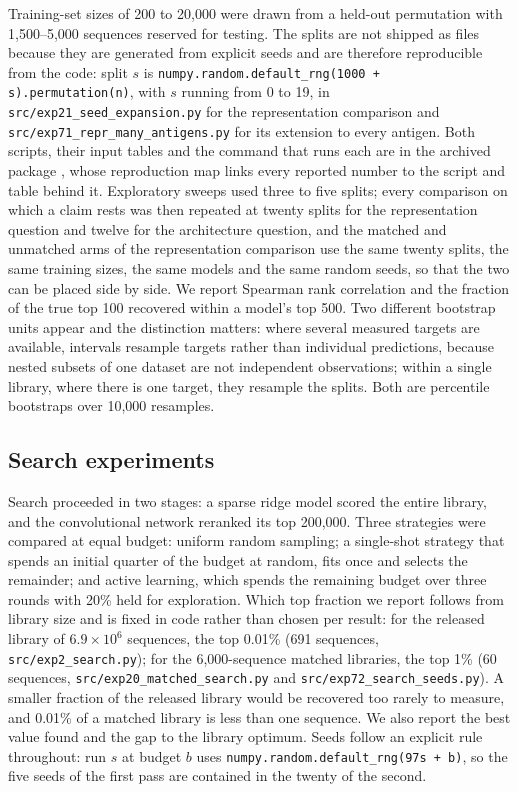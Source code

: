\documentclass[pdflatex,sn-nature]{sn-jnl}
\theoremstyle{thmstyleone}
\theoremstyle{thmstyletwo}
\theoremstyle{thmstylethree}
\begin{document}
Training-set sizes of 200 to 20{,}000 were drawn from a held-out permutation
with 1{,}500--5{,}000 sequences reserved for testing. The splits are not
shipped as files because they are generated from explicit seeds and are
therefore reproducible from the code: split $s$ is
\texttt{numpy.random.default\_rng(1000 + s).permutation(n)}, with $s$ running
from 0 to 19, in \texttt{src/exp21\_seed\_expansion.py} for the representation
comparison and \texttt{src/exp71\_repr\_many\_antigens.py} for its extension to
every antigen. Both scripts, their input tables and the command that runs each
are in the archived package \cite{libmatch2026}, whose reproduction map links
every reported number to the script and table behind it. Exploratory sweeps used
three to five splits; every comparison on which a claim rests was then repeated
at twenty splits for the representation question and twelve for the
architecture question, and the matched and unmatched arms of the representation
comparison use the same twenty splits, the same training sizes, the same models
and the same random seeds, so that the two can be placed side by side. We
report Spearman rank correlation and the fraction of the true top 100 recovered
within a model's top 500. Two different bootstrap units appear and the
distinction matters: where several measured targets are available, intervals
resample targets rather than individual predictions, because nested subsets of
one dataset are not independent observations; within a single library, where
there is one target, they resample the splits. Both are percentile bootstraps
over 10{,}000 resamples.

\subsection*{Search experiments}

Search proceeded in two stages: a sparse ridge model scored the entire library,
and the convolutional network reranked its top 200{,}000. Three strategies were
compared at equal budget: uniform random sampling; a single-shot strategy that
spends an initial quarter of the budget at random, fits once and selects the
remainder; and active learning, which spends the remaining budget over three
rounds with 20\% held for exploration. Which top fraction we report follows from library size and is fixed in code
rather than chosen per result: for the released library of $6.9\times10^{6}$
sequences, the top 0.01\% (691 sequences, \texttt{src/exp2\_search.py}); for
the 6{,}000-sequence matched libraries, the top 1\% (60 sequences,
\texttt{src/exp20\_matched\_search.py} and
\texttt{src/exp72\_search\_seeds.py}). A smaller fraction of the released
library would be recovered too rarely to measure, and 0.01\% of a matched
library is less than one sequence. We also report the best value found and the
gap to the library optimum. Seeds follow an explicit rule throughout: run $s$
at budget $b$ uses \texttt{numpy.random.default\_rng(97s + b)}, so the five
seeds of the first pass are contained in the twenty of the second.
\end{document}
